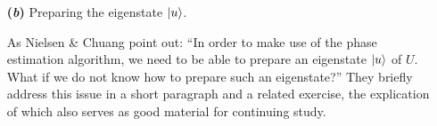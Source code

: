 \documentclass{article}
\begin{document}
\begin{enumerate}[label=\textbf{(\arabic*)}]
\begin{itemize}
    \vspace{0.1in}
    
    \item[\textbf{(\textit{b})}] Preparing the eigenstate $\ket{u}$.
    
    \vspace{0.1in}
    
    As Nielsen \& Chuang point out: ``In order to make use of the phase estimation algorithm, we need to be able to prepare an eigenstate $\ket{u}$ of $U$. What if we do not know how to prepare such an eigenstate?'' They briefly address this issue in a short paragraph and a related exercise, the explication of which also serves as good material for continuing study.
    
\end{itemize}

\end{enumerate}

\clearpage
\printbibliography
\end{document}
